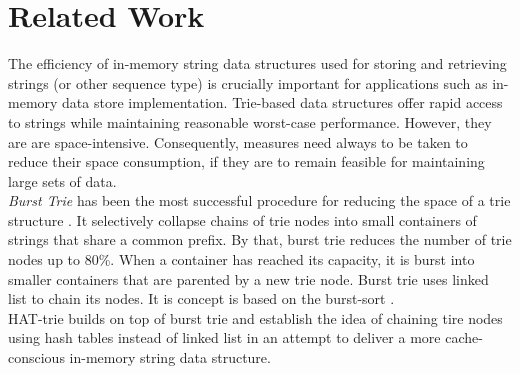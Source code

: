 \chapter{Related Work}
\label{ch:relatedword}

The efficiency of in-memory string data structures used for storing and retrieving strings (or other sequence type) is crucially important for applications such as in-memory data store implementation. 
Trie-based data structures offer rapid access to strings while
maintaining reasonable worst-case performance. However, they are are space-intensive. Consequently, measures need always to be taken to reduce their space consumption, if they are to remain feasible for maintaining large sets of data. \\

\textit{Burst Trie} has been the most successful procedure for reducing the space of a trie structure \cite{bursttrie}. It selectively collapse chains of trie nodes into small containers of strings that share a common prefix. By that, burst trie reduces the number of trie nodes up to 80\%. When a container has reached its capacity, it is burst into smaller containers that
are parented by a new trie node. Burst trie uses linked list to chain its nodes. It is concept is based on the burst-sort \cite{burstsort}. \\

HAT-trie \cite{HATTRIE} builds on top of burst trie and establish the idea of chaining tire nodes using hash tables instead of linked list in an attempt to deliver a more cache-conscious in-memory string data structure. \\
